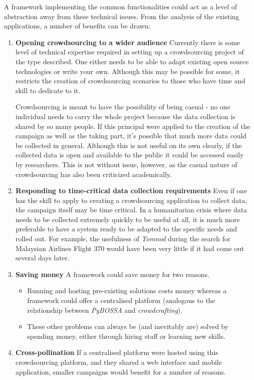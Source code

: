 \documentclass{article}
\newcommand{\pitem}[1]{
	\item{\textbf{#1}}
}
\begin{document}
		A framework implementing the common functionalities could act as a level of abstraction away from these technical issues. From the analysis of the existing applications, a number of benefits can be drawn:

		\begin{enumerate}
			\pitem{Opening crowdsourcing to a wider audience} Currently there is some level of technical expertise required in setting up a crowdsourcing project of the type described. One either needs to be able to adapt existing open source technologies or write your own. Although this may be possible for some, it restricts the creation of crowdsourcing scenarios to those who have time and skill to dedicate to it.

			Crowdsourcing is meant to have the possibility of being casual - no one individual needs to carry the whole project because the data collection is shared by so many people. If this principal were applied to the creation of the campaign as well as the taking part, it's possible that much more data could be collected in general. Although this is not useful on its own clearly, if the collected data is open and available to the public it could be accessed easily by researchers. This is not without issue, however, as the casual nature of crowdsourcing has also been criticized academically\cite{brabham_myth_2012}.
			\pitem{Responding to time-critical data collection requirements} Even if one has the skill to apply to creating a crowdsourcing application to collect data, the campaign itself may be time critical. In a humanitarian crisis where data needs to be collected extremely quickly to be useful at all, it is much more preferable to have a system ready to be adapted to the specific needs and rolled out. For example, the usefulness of \emph{Tomnod} during the search for Malaysian Airlines Flight 370 would have been very little if it had come out several days later.
			\pitem{Saving money} A framework could save money for two reasons.
			\begin{itemize}
				\item Running and hosting pre-existing solutions costs money whereas a framework could offer a centralised platform (analogous to the relationship between \emph{PyBOSSA} and \emph{crowdcrafting}).
				\item These other problems can always be (and inevitably are) solved by spending money, either through hiring staff or learning new skills.
			\end{itemize}
			\pitem{Cross-pollination} If a centralised platform were hosted using this crowdsourcing platform, and they shared a web interface and mobile application, smaller campaigns would benefit for a number of reasons.

\end{enumerate}
\end{document}
